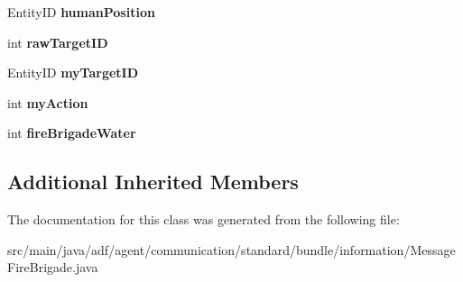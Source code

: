 \begin{DoxyCompactItemize}
Entity\+ID {\bfseries human\+Position}
\item 
\hypertarget{classadf_1_1agent_1_1communication_1_1standard_1_1bundle_1_1information_1_1MessageFireBrigade_ade72f4ed2f9ee91b683016d412194a5c}{}\label{classadf_1_1agent_1_1communication_1_1standard_1_1bundle_1_1information_1_1MessageFireBrigade_ade72f4ed2f9ee91b683016d412194a5c} 
int {\bfseries raw\+Target\+ID}
\item 
\hypertarget{classadf_1_1agent_1_1communication_1_1standard_1_1bundle_1_1information_1_1MessageFireBrigade_aa6867a4e9cb8cf725c3e1a0b95d1e73f}{}\label{classadf_1_1agent_1_1communication_1_1standard_1_1bundle_1_1information_1_1MessageFireBrigade_aa6867a4e9cb8cf725c3e1a0b95d1e73f} 
Entity\+ID {\bfseries my\+Target\+ID}
\item 
\hypertarget{classadf_1_1agent_1_1communication_1_1standard_1_1bundle_1_1information_1_1MessageFireBrigade_af50a982c632517633dc389957d2b6a6d}{}\label{classadf_1_1agent_1_1communication_1_1standard_1_1bundle_1_1information_1_1MessageFireBrigade_af50a982c632517633dc389957d2b6a6d} 
int {\bfseries my\+Action}
\item 
\hypertarget{classadf_1_1agent_1_1communication_1_1standard_1_1bundle_1_1information_1_1MessageFireBrigade_a920c8da5ee4115534e8bdaad273b84fa}{}\label{classadf_1_1agent_1_1communication_1_1standard_1_1bundle_1_1information_1_1MessageFireBrigade_a920c8da5ee4115534e8bdaad273b84fa} 
int {\bfseries fire\+Brigade\+Water}
\end{DoxyCompactItemize}
\subsection*{Additional Inherited Members}


The documentation for this class was generated from the following file\+:\begin{DoxyCompactItemize}
\item 
src/main/java/adf/agent/communication/standard/bundle/information/Message\+Fire\+Brigade.\+java\end{DoxyCompactItemize}
